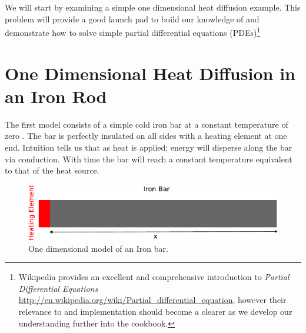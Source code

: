 
%
%
%

We will start by examining a simple one dimensional heat diffusion example. This problem will provide a good launch pad to build our knowledge of \esc and demonstrate how to solve simple partial differential equations (PDEs)\footnote{Wikipedia provides an excellent and comprehensive introduction to \textit{Partial Differential Equations} \url{http://en.wikipedia.org/wiki/Partial_differential_equation}, however their relevance to \esc and implementation should become a clearer as we develop our understanding further into the cookbook.}

\section{One Dimensional Heat Diffusion in an Iron Rod}
The first model consists of a simple cold iron bar at a constant temperature of zero . The bar is perfectly insulated on all sides with a heating element at one end. Intuition tells us that as heat is applied; energy will disperse along the bar via conduction. With time the bar will reach a constant temperature equivalent to that of the heat source.
\begin{figure}[h!]
\centerline{\includegraphics[width=4.in]{figures/onedheatdiff}}
\caption{One dimensional model of an Iron bar.}
\label{fig:onedhdmodel}
\end{figure}
